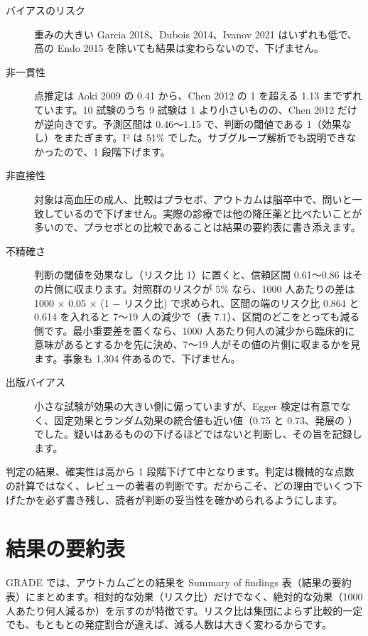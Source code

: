 \begin{description}
\item[バイアスのリスク] 重みの大きい Garcia 2018、Dubois 2014、Ivanov 2021 はいずれも低で、高の Endo 2015 を除いても結果は変わらないので、下げません。
\item[非一貫性] 点推定は Aoki 2009 の 0.41 から、Chen 2012 の 1 を超える 1.13 までずれています。10 試験のうち 9 試験は 1 より小さいものの、Chen 2012 だけが逆向きです。予測区間は 0.46〜1.15 で、判断の閾値である 1（効果なし）をまたぎます。I² は 51\% でした。サブグループ解析でも説明できなかったので、1 段階下げます。
\item[非直接性] 対象は高血圧の成人、比較はプラセボ、アウトカムは脳卒中で、問いと一致しているので下げません。実際の診療では他の降圧薬と比べたいことが多いので、プラセボとの比較であることは結果の要約表に書き添えます。
\item[不精確さ] 判断の閾値を効果なし（リスク比 1）に置くと、信頼区間 0.61〜0.86 はその片側に収まります。対照群のリスクが 5\% なら、1000 人あたりの差は 1000 × 0.05 × (1 − リスク比) で求められ、区間の端のリスク比 0.864 と 0.614 を入れると 7〜19 人の減少で（表 7.1）、区間のどこをとっても減る側です。最小重要差を置くなら、1000 人あたり何人の減少から臨床的に意味があるとするかを先に決め、7〜19 人がその値の片側に収まるかを見ます。事象も 1,304 件あるので、下げません。
\item[出版バイアス] 小さな試験が効果の大きい側に偏っていますが、Egger 検定は有意でなく、固定効果とランダム効果の統合値も近い値（0.75 と 0.73、発展の ）でした。疑いはあるものの下げるほどではないと判断し、その旨を記録します。
\end{description}

判定の結果、確実性は高から 1 段階下げて中となります。判定は機械的な点数の計算ではなく、レビューの著者の判断です。だからこそ、どの理由でいくつ下げたかを必ず書き残し、読者が判断の妥当性を確かめられるようにします。

\section{結果の要約表}
\label{sec:07-9}

GRADE では、アウトカムごとの結果を Summary of findings 表（結果の要約表）にまとめます。相対的な効果（リスク比）だけでなく、絶対的な効果（1000 人あたり何人減るか）を示すのが特徴です。リスク比は集団によらず比較的一定でも、もともとの発症割合が違えば、減る人数は大きく変わるからです。

\begin{kkcenter}
\end{kkcenter}

